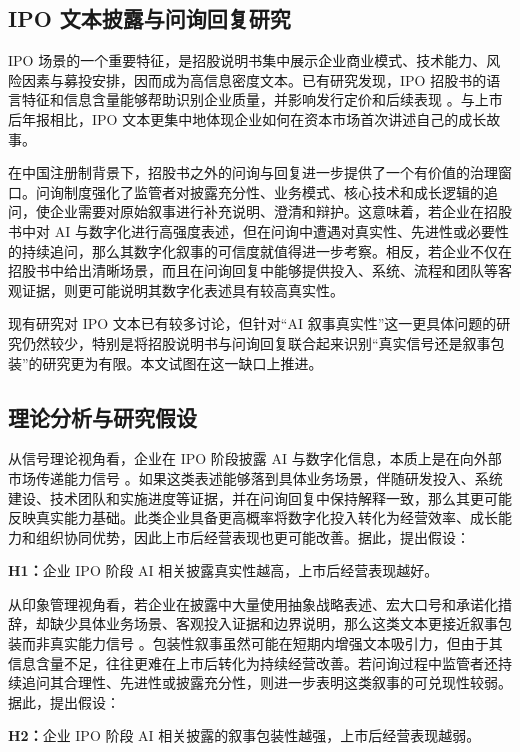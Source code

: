\subsection{IPO 文本披露与问询回复研究}

IPO 场景的一个重要特征，是招股说明书集中展示企业商业模式、技术能力、风险因素与募投安排，因而成为高信息密度文本。已有研究发现，IPO 招股书的语言特征和信息含量能够帮助识别企业质量，并影响发行定价和后续表现 \citep{Hanley_2010,Loughran_2013}。与上市后年报相比，IPO 文本更集中地体现企业如何在资本市场首次讲述自己的成长故事。

在中国注册制背景下，招股书之外的问询与回复进一步提供了一个有价值的治理窗口。问询制度强化了监管者对披露充分性、业务模式、核心技术和成长逻辑的追问，使企业需要对原始叙事进行补充说明、澄清和辩护。这意味着，若企业在招股书中对 AI 与数字化进行高强度表述，但在问询中遭遇对真实性、先进性或必要性的持续追问，那么其数字化叙事的可信度就值得进一步考察。相反，若企业不仅在招股书中给出清晰场景，而且在问询回复中能够提供投入、系统、流程和团队等客观证据，则更可能说明其数字化表述具有较高真实性。

现有研究对 IPO 文本已有较多讨论，但针对“AI 叙事真实性”这一更具体问题的研究仍然较少，特别是将招股说明书与问询回复联合起来识别“真实信号还是叙事包装”的研究更为有限。本文试图在这一缺口上推进。

\subsection{理论分析与研究假设}

从信号理论视角看，企业在 IPO 阶段披露 AI 与数字化信息，本质上是在向外部市场传递能力信号 \citep{Spence_1973}。如果这类表述能够落到具体业务场景，伴随研发投入、系统建设、技术团队和实施进度等证据，并在问询回复中保持解释一致，那么其更可能反映真实能力基础。此类企业具备更高概率将数字化投入转化为经营效率、成长能力和组织协同优势，因此上市后经营表现也更可能改善。据此，提出假设：

\textbf{H1：}企业 IPO 阶段 AI 相关披露真实性越高，上市后经营表现越好。

从印象管理视角看，若企业在披露中大量使用抽象战略表述、宏大口号和承诺化措辞，却缺少具体业务场景、客观投入证据和边界说明，那么这类文本更接近叙事包装而非真实能力信号 \citep{MerklDaviesConcept2011,Huang2014}。包装性叙事虽然可能在短期内增强文本吸引力，但由于其信息含量不足，往往更难在上市后转化为持续经营改善。若问询过程中监管者还持续追问其合理性、先进性或披露充分性，则进一步表明这类叙事的可兑现性较弱。据此，提出假设：

\textbf{H2：}企业 IPO 阶段 AI 相关披露的叙事包装性越强，上市后经营表现越弱。
